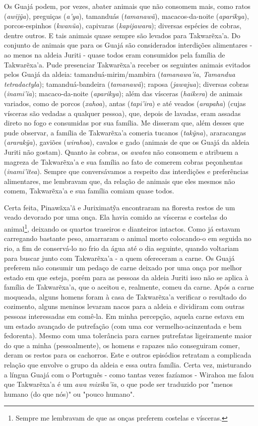Os Guajá podem, por vezes, abater animais que não consomem mais, como
ratos (\emph{awijỹa}), preguiças (\emph{a'ya}), tamanduás
(\emph{tamanawã}), macacos-da-noite (\emph{aparikya}), porcos-espinhos
(\emph{kwanũa}), capivaras (\emph{kapijawara}); diversas espécies de
cobras, dentre outros. E tais animais quase sempre são levados para
Takwarẽxa'a. Do conjunto de animais que para os Guajá são considerados
interdições alimentares - ao menos na aldeia Juriti - quase todos eram
consumidos pela família de Takwarẽxa'a. Pude presenciar Takwarẽxa'a
receber os seguintes animais evitados pelos Guajá da aldeia:
tamanduá-mirim/mambira (\emph{tamanawa'ia}, \emph{Tamandua
tetradactyla}); tamanduá-bandeira (\emph{tamanawã}); raposa
(\emph{jawajua}); diversas cobras (\emph{inami'ĩa}); macaco-da-noite
(\emph{aparikya}); além das vísceras (\emph{haikera}) de animais
variados, como de porcos (\emph{xahoa}), antas (\emph{tapi'ira}) e até
veados (\emph{arapaha}) (cujas vísceras são vedadas a qualquer pessoa),
que, depois de lavadas, eram assadas direto no fogo e consumidas por sua
família. Me disseram que, além desses que pude observar, a família de
Takwarẽxa'a comeria tucanos (\emph{takỹna}), araracangas
(\emph{ararakỹa}), gaviões (\emph{wirahoa}), cavalos e gado (animais de
que os Guajá da aldeia Juriti não gostam). Quanto às cobras, os
\emph{awatea} não consomem e atribuem a magreza de Takwarẽxa'a e sua
família ao fato de comerem cobras peçonhentas (\emph{inami'ĩtea}).
Sempre que conversávamos a respeito das interdições e preferências
alimentares, me lembravam que, da relação de animais que eles mesmos não
comem, Takwarẽxa'a e sua família comiam quase todos.

Certa feita, Pinawãxa'ã e Juriximatỹa encontraram na floresta restos de
um veado devorado por uma onça. Ela havia comido as vísceras e costelas
do animal\footnote{Sempre me lembravam de que as onças preferem costelas
  e vísceras.}, deixando os quartos traseiros e dianteiros intactos.
Como já estavam carregando bastante peso, amarraram o animal morto
colocando-o em seguida no rio, a fim de conservá-lo no frio da água até
o dia seguinte, quando voltariam para buscar junto com Takwarẽxa'a - a
quem ofereceram a carne. Os Guajá preferem não consumir um pedaço de
carne deixado por uma onça por melhor estado em que esteja, porém para
as pessoas da aldeia Juriti isso não se aplica à família de Takwarẽxa'a,
que o aceitou e, realmente, comeu da carne. Após a carne moqueada,
alguns homens foram à casa de Takwarẽxa'a verificar o resultado do
cozimento, alguns meninos levaram nacos para a aldeia e dividiram com
outras pessoas interessadas em comê-la. Em minha percepção, aquela carne
estava em um estado avançado de putrefação (com uma cor
vermelho-acinzentada e bem fedorenta). Mesmo com uma tolerância para
carnes putrefatas ligeiramente maior do que a minha (pessoalmente), os
homens e rapazes não conseguiram comer, deram os restos para os
cachorros. Este e outros episódios retratam a complicada relação que
envolve o grupo da aldeia e essa outra família. Certa vez, misturando a
língua Guajá com o Português - como tantas vezes fazíamos - Wirahoa me
falou que Takwarẽxa'a é um \emph{awa} \emph{mixika'ĩa}, o que pode ser
traduzido por "menos humano (do que nós)" ou "pouco humano".

